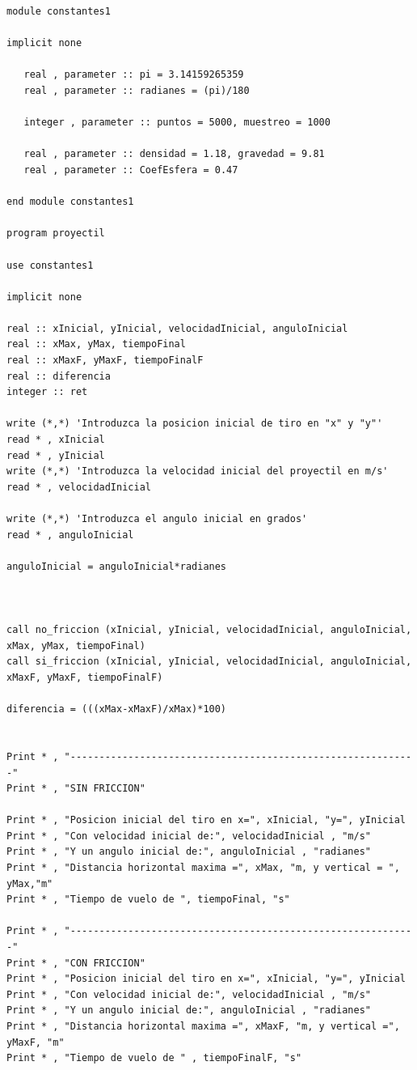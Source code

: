 \documentclass[10pt]{article}
\begin{document}
\begin{verbatim}
module constantes1

implicit none

   real , parameter :: pi = 3.14159265359
   real , parameter :: radianes = (pi)/180

   integer , parameter :: puntos = 5000, muestreo = 1000

   real , parameter :: densidad = 1.18, gravedad = 9.81
   real , parameter :: CoefEsfera = 0.47

end module constantes1

program proyectil

use constantes1

implicit none

real :: xInicial, yInicial, velocidadInicial, anguloInicial 
real :: xMax, yMax, tiempoFinal
real :: xMaxF, yMaxF, tiempoFinalF
real :: diferencia
integer :: ret

write (*,*) 'Introduzca la posicion inicial de tiro en "x" y "y"'
read * , xInicial
read * , yInicial
write (*,*) 'Introduzca la velocidad inicial del proyectil en m/s'
read * , velocidadInicial

write (*,*) 'Introduzca el angulo inicial en grados'
read * , anguloInicial

anguloInicial = anguloInicial*radianes


 
call no_friccion (xInicial, yInicial, velocidadInicial, anguloInicial, xMax, yMax, tiempoFinal)
call si_friccion (xInicial, yInicial, velocidadInicial, anguloInicial, xMaxF, yMaxF, tiempoFinalF)

diferencia = (((xMax-xMaxF)/xMax)*100)


Print * , "------------------------------------------------------------"
Print * , "SIN FRICCION"

Print * , "Posicion inicial del tiro en x=", xInicial, "y=", yInicial
Print * , "Con velocidad inicial de:", velocidadInicial , "m/s"
Print * , "Y un angulo inicial de:", anguloInicial , "radianes"
Print * , "Distancia horizontal maxima =", xMax, "m, y vertical = ", yMax,"m"
Print * , "Tiempo de vuelo de ", tiempoFinal, "s"

Print * , "------------------------------------------------------------"
Print * , "CON FRICCION"
Print * , "Posicion inicial del tiro en x=", xInicial, "y=", yInicial
Print * , "Con velocidad inicial de:", velocidadInicial , "m/s"
Print * , "Y un angulo inicial de:", anguloInicial , "radianes"
Print * , "Distancia horizontal maxima =", xMaxF, "m, y vertical =", yMaxF, "m"
Print * , "Tiempo de vuelo de " , tiempoFinalF, "s"


\end{verbatim}
\end{document}
